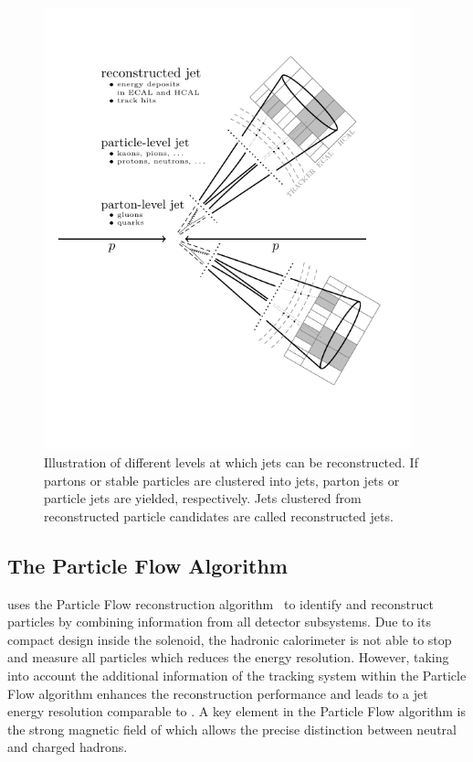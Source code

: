 \begin{figure}[h!tbp]
    \centering
    \includegraphics[width=0.95\textwidth]{figures/drawings/particlejet.pdf}
    \caption[Illustration of jet reconstruction levels]{Illustration of different
    levels at which jets can be reconstructed. If partons or stable particles are
clustered into jets, parton jets or particle jets are yielded, respectively.
Jets clustered from reconstructed particle candidates are called reconstructed
jets.}
    \label{fig:jet_levels}
\end{figure}


\subsection{The Particle Flow Algorithm}
\label{sec:particle_flow_algorithm}

\CMS uses the Particle Flow reconstruction
algorithm~\cite{CMS-PAS-PFT-09-001,CMS-PAS-PFT-10-001} to identify and
reconstruct particles by combining information from all detector
subsystems. Due to its compact design inside the solenoid, the hadronic
calorimeter is not able to stop and measure all particles which reduces the
energy resolution. However, taking into account the additional information of
the tracking system within the Particle Flow algorithm enhances the
reconstruction performance and leads to a jet energy resolution comparable to
\ATLAS. A key element in the Particle Flow algorithm is the strong magnetic field
of \CMS which allows the precise distinction between neutral and charged hadrons. 


